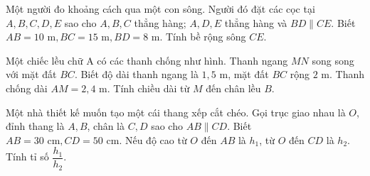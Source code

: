 \begin{bt}%
	Một người đo khoảng cách qua một con sông. Người đó đặt các cọc tại $A, B, C, D, E$ sao cho $A, B, C$ thẳng hàng; $A, D, E$ thẳng hàng và $BD \parallel CE$. Biết $AB = 10\text{ m}, BC = 15\text{ m}, BD = 8\text{ m}$. Tính bề rộng sông $CE$.
\end{bt}

\begin{bt}%
	Một chiếc lều chữ A có các thanh chống như hình. Thanh ngang $MN$ song song với mặt đất $BC$. Biết độ dài thanh ngang là $1{,}5\text{ m}$, mặt đất $BC$ rộng $2\text{ m}$. Thanh chống dài $AM = 2{,}4\text{ m}$. Tính chiều dài từ $M$ đến chân lều $B$.
\end{bt}

\begin{bt}%
	Một nhà thiết kế muốn tạo một cái thang xếp cắt chéo. Gọi trục giao nhau là $O$, đỉnh thang là $A, B$, chân là $C, D$ sao cho $AB \parallel CD$. Biết $AB = 30\text{ cm}, CD = 50\text{ cm}$. Nếu độ cao từ $O$ đến $AB$ là $h_1$, từ $O$ đến $CD$ là $h_2$. Tính tỉ số $\dfrac{h_1}{h_2}$.
\end{bt}

